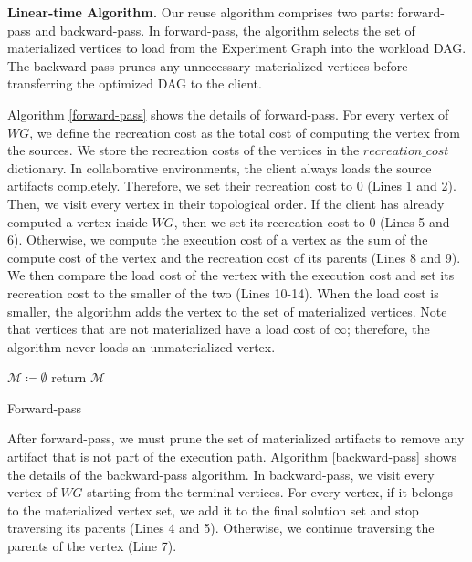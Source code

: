 \textbf{Linear-time Algorithm.}
Our reuse algorithm comprises two parts: forward-pass and backward-pass.
In forward-pass, the algorithm selects the set of materialized vertices to load from the Experiment Graph into the workload DAG.
The backward-pass prunes any unnecessary materialized vertices before transferring the optimized DAG to the client.

Algorithm \ref{forward-pass} shows the details of forward-pass.
For every vertex of $WG$, we define the recreation cost as the total cost of computing the vertex from the sources.
We store the recreation costs of the vertices in the $recreation\_cost$ dictionary.
In collaborative environments, the client always loads the source artifacts completely.
Therefore, we set their recreation cost to 0 (Lines 1 and 2).
Then, we visit every vertex in their topological order.
If the client has already computed a vertex inside $WG$, then we set its recreation cost to 0 (Lines 5 and 6).
Otherwise, we compute the execution cost of a vertex as the sum of the compute cost of the vertex and the recreation cost of its parents (Lines 8 and 9).
We then compare the load cost of the vertex with the execution cost and set its recreation cost to the smaller of the two (Lines 10-14).
When the load cost is smaller, the algorithm adds the vertex to the set of materialized vertices.
Note that vertices that are not materialized have a load cost of $\infty$; therefore, the algorithm never loads an unmaterialized vertex.

\begin{algorithm}[h]
$\mathcal{M} \coloneqq \emptyset$\;
return $\mathcal{M}$\;
\caption{Forward-pass}\label{forward-pass}
\end{algorithm}
After forward-pass, we must prune the set of materialized artifacts to remove any artifact that is not part of the execution path.
Algorithm \ref{backward-pass} shows the details of the backward-pass algorithm.
In backward-pass, we visit every vertex of $WG$ starting from the terminal vertices.
For every vertex, if it belongs to the materialized vertex set, we add it to the final solution set and stop traversing its parents (Lines 4 and 5).
Otherwise, we continue traversing the parents of the vertex (Line 7).

